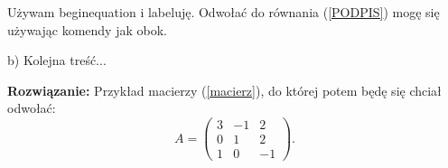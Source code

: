 \documentclass[11pt]{article}
\begin{document}
\begin{enumerate}
Używam begin{equation} i labeluję. Odwołać do równania (\ref{PODPIS}) mogę się używając komendy jak obok.

\par
\bigskip

b) Kolejna treść...\par
\medskip
\textbf{Rozwiązanie: }
Przykład macierzy (\ref{macierz}), do której potem będę się chciał odwołać:
\begin{equation}
\label{macierz}
    A = \left(
    \begin{array}{ccc} %
    3 & -1 & 2 \\ 	
    0 & 1 & 2 \\ 
    1 & 0 & -1 
\end{array} 
\right).  
\end{equation}

\end{enumerate}
\end{document}

